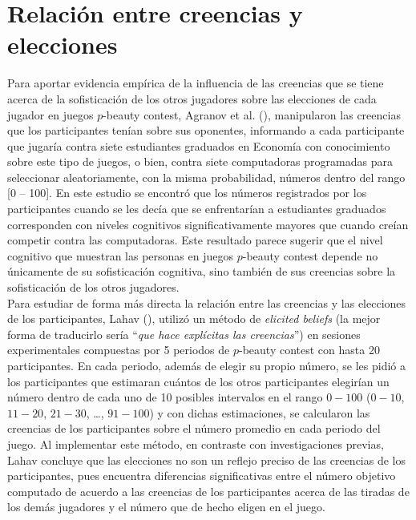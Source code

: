 \section{Relación entre creencias y elecciones}

Para aportar evidencia empírica de la influencia de las creencias que se tiene acerca de la sofisticación de los otros jugadores sobre las elecciones de cada jugador en juegos $p$-beauty contest, Agranov et al. (\citeyear{Agranov}), manipularon las creencias que los participantes tenían sobre sus oponentes, informando a cada participante que jugaría contra siete estudiantes graduados en Economía con conocimiento sobre este tipo de juegos, o bien, contra siete computadoras programadas para seleccionar aleatoriamente, con la misma probabilidad,  números dentro del rango [0 – 100]. En este estudio se encontró que los números registrados por los participantes cuando se les decía que se enfrentarían a estudiantes graduados corresponden con niveles cognitivos significativamente mayores que cuando creían competir contra las computadoras. Este resultado parece sugerir que el nivel cognitivo que muestran las personas en juegos $p$-beauty contest depende no únicamente de su sofisticación cognitiva, sino también de sus creencias sobre la sofisticación de los otros jugadores.\\

Para estudiar de forma más directa la relación entre las creencias y las elecciones de los participantes, Lahav (\citeyear{Lahav}), utilizó un método de \textit{elicited beliefs} (la mejor forma de traducirlo sería “\textit{que hace explícitas las creencias}”) en sesiones experimentales compuestas por 5 periodos de $p$-beauty contest con hasta 20 participantes. En cada periodo, además de elegir su propio número, se les pidió a los participantes que estimaran cuántos de los otros participantes elegirían un número dentro de cada uno de 10 posibles intervalos en el rango $0-100$ ($0-10$, $11-20$, $21-30$, …, $91-100$) y con dichas estimaciones, se calcularon las creencias de los participantes sobre el número promedio en cada periodo del juego. Al implementar este método, en contraste con investigaciones previas, Lahav concluye que las elecciones no son un reflejo preciso de las creencias de los participantes, pues encuentra diferencias significativas entre el número objetivo computado de acuerdo a las creencias de los participantes acerca de las tiradas de los demás jugadores y el número que de hecho eligen en el juego.\\

